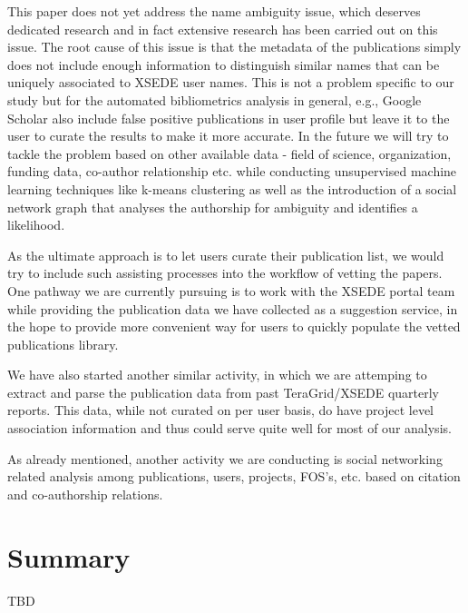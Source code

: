 \documentclass{sig-alternate}
\begin{document}
This paper does not yet address the name ambiguity issue, which deserves dedicated research and in fact extensive research has been carried out on this issue. The root cause of this issue is that the metadata of the publications simply does not include enough information to distinguish similar names that can be uniquely associated to XSEDE user names. This is not a problem specific to our study but for the automated bibliometrics analysis in general, e.g., Google Scholar also include false positive publications in user profile but leave it to the user to curate the results to make it more accurate. In the future we will try to tackle the problem based on other available data - field of science, organization, funding data, co-author relationship etc. while conducting unsupervised machine learning techniques like k-means clustering as well as the introduction of a social network graph that analyses the authorship for ambiguity and identifies a likelihood.
 
As the ultimate approach is to let users curate their publication list, we would try to include such assisting processes into the workflow of vetting the papers. One pathway we are currently pursuing is to work with the XSEDE portal team while providing the publication data we have collected as a suggestion service, in the hope to provide more convenient way for users to quickly populate the vetted publications library. 
 
We have also started another similar activity, in which we are attemping to  extract and parse the publication data from past TeraGrid/XSEDE quarterly reports. This data, while not curated on per user basis, do have project level association information and thus could serve quite well for most of our analysis. 
 
As already mentioned, another activity we are conducting is social networking related analysis among publications, users, projects, FOS’s, etc. based on citation and co-authorship relations. 
 
\section{Summary}

TBD 
 
 
 
\end{document}

